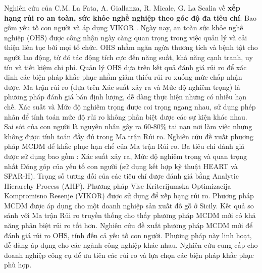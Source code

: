 Nghiên cứu của C.M. La Fata, A. Giallanza, R. Micale, G. La Scalia về \textbf{xếp hạng rủi ro an toàn, sức khỏe nghề nghiệp theo góc độ đa tiêu chí}: Bao gồm yếu tố con người và áp dụng VIKOR \cite{sciencedirect3}. Ngày nay, an toàn sức khỏe nghề nghiệp (OHS) được công nhận ngày càng quan trọng trong việc quản lý và cải thiện liên tục bởi mọi tổ chức. OHS nhằm ngăn ngừa thương tích và bệnh tật cho người lao động, từ đó tác động tích cực đến năng suất, khả năng cạnh tranh, uy tín và tiết kiệm chi phí.  Quản lý OHS dựa trên kết quả đánh giá rủi ro để xác định các biện pháp khắc phục nhằm giảm thiểu rủi ro xuống mức chấp nhận được. Ma trận rủi ro (dựa trên Xác suất xảy ra và Mức độ nghiêm trọng) là phương pháp đánh giá bán định lượng, dễ dàng thực hiện nhưng có nhiều hạn chế. Xác suất và Mức độ nghiêm trọng được coi trọng ngang nhau, sử dụng phép nhân để tính toán mức độ rủi ro không phân biệt được các sự kiện khác nhau. Sai sót của con người là nguyên nhân gây ra 60-80\% tai nạn nơi làm việc nhưng không được tính toán đầy đủ trong Ma trận Rủi ro. Nghiên cứu đề xuất phương pháp MCDM để khắc phục hạn chế của Ma trận Rủi ro. Ba tiêu chí đánh giá được sử dụng bao gồm : Xác suất xảy ra, Mức độ nghiêm trọng và quan trọng nhất Đóng góp của yếu tố con người (sử dụng kết hợp kỹ thuật HEART và SPAR-H). Trọng số tương đối của các tiêu chí được đánh giá bằng Analytic Hierarchy Process (AHP). Phương pháp Vlse Kriterijumska Optimizacija Kompromisno Resenje (VIKOR) được sử dụng để xếp hạng rủi ro. Phương pháp MCDM được áp dụng cho một doanh nghiệp sản xuất đồ gỗ ở Sicily. Kết quả so sánh với Ma trận Rủi ro truyền thống cho thấy phương pháp MCDM mới có khả năng phân biệt rủi ro tốt hơn. Nghiên cứu đề xuất phương pháp MCDM mới để đánh giá rủi ro OHS, tính đến cả yếu tố con người. Phương pháp này linh hoạt, dễ dàng áp dụng cho các ngành công nghiệp khác nhau. Nghiên cứu cung cấp cho doanh nghiệp công cụ để ưu tiên các rủi ro và lựa chọn các biện pháp khắc phục phù hợp.


